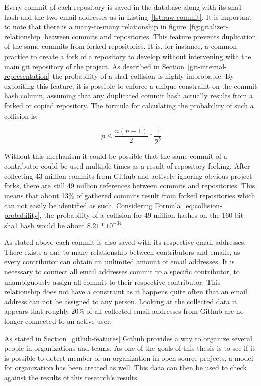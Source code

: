 Every commit of each repository is saved in the database along with its \ac{sha1} hash and the two email addresses as in Listing~\ref{lst:raw-commit}.
It is important to note that there is a many-to-many relationship in figure~\ref{fig:gitalizer-relationship} between commits and repositories.
This feature prevents duplication of the same commits from forked repositories.
It is, for instance, a common practice to create a fork of a repository to develop without intervening with the main git repository of the project.
As described in Section~\ref{git-internal-representation} the probability of a \ac{sha1} collision is highly improbable.
By exploiting this feature, it is possible to enforce a unique constraint on the commit hash column, assuming that any duplicated commit hash actually results from a forked or copied repository.
The formula for calculating the probability of such a collision is:

\begin{equation}\label{eq:collision-probability}
    p \leq \frac{n(n-1)}{2} * \frac{1}{2^{b}}
\end{equation}

Without this mechanism it could be possible that the same commit of a contributor could be used multiple times as a result of repository forking.
After collecting 43 million commits from Github and actively ignoring obvious project forks, there are still 49 million references between commits and repositories.
This means that about 13\% of gathered commits result from forked repositories which can not easily be identified as such.
Considering Formula~\ref{eq:collision-probability}, the probability of a collision for 49 million hashes on the 160 bit \ac{sha1} hash would be about $8.21 * 10^{-34}$.

As stated above each commit is also saved with its respective email addresses.
There exists a one-to-many relationship between contributors and emails, as every contributor can obtain an unlimited amount of email addresses.
It is necessary to connect all email addresses commit to a specific contributor, to unambiguously assign all commit to their respective contributor.
This relationship does not have a  constraint as it happens quite often that an email address can not be assigned to any person.
Looking at the collected data it appears that roughly 20\% of all collected email addresses from Github are no longer connected to an active user.

As stated in Section~\ref{github-features} Github provides a way to organize several people in organizations and teams.
As one of the goals of this thesis is to see if it is possible to detect member of an organization in open-source projects, a model for organization has been created as well.
This data can then be used to check against the results of this research's results.


